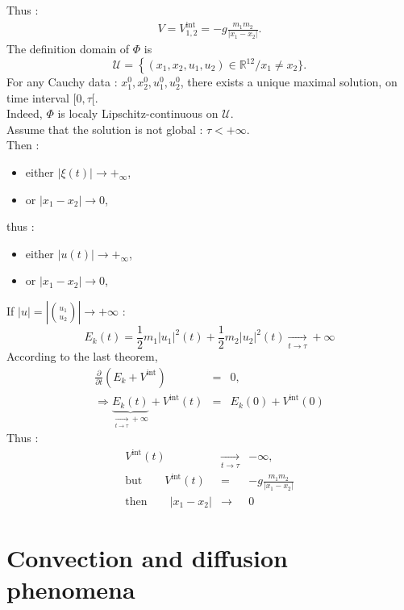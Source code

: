 \documentclass{report}
\newcommand*{\bfrac}[2]{\genfrac{(}{)}{0pt}{}{#1}{#2}}
\theoremstyle{plain}
\theoremstyle{definition}
\theoremstyle{remark}
\begin{document}
Thus : 
\begin{eqnarray}
V = V_{1,2}^{\text{int}} = - g \frac{m_1 m_2}{\vert x_1 - x_2\vert}.
\end{eqnarray} 
The definition domain of $\Phi$ is 
\begin{equation}
\mathcal{U} = \left\lbrace (x_1,x_2,u_1,u_2) \in \mathbb{R}^{12} / x_1 \neq x_2 \right.\rbrace.
\end{equation}
For any Cauchy data : $x_1^0,x_2^0,u_1^0,u_2^0$, there exists a unique maximal solution, on time interval $[0,\tau[$. \\Indeed, $\Phi$ is localy Lipschitz-continuous on $\mathcal{U}$. \\
Assume that the solution is not global : $\tau < +\infty$.\\
Then : 
\begin{itemize}
\item either $\vert \xi(t) \vert \rightarrow +_\infty$,
\item or $\vert x_1 - x_2 \vert \rightarrow 0$,
\end{itemize}
thus : 
\begin{itemize}
\item either $\vert u(t) \vert \rightarrow +_\infty$,
\item or $\vert x_1 - x_2 \vert \rightarrow 0$,
\end{itemize}
If $\vert u \vert = \left\vert \bfrac{u_1}{u_2} \right\vert \rightarrow +\infty$ : 
\begin{equation}
E_k(t) = \frac{1}{2}m_1\vert u_1\vert^2(t) + \frac{1}{2}m_2\vert u_2\vert^2(t)\xrightarrow[t\rightarrow\tau]{}+\infty 
\end{equation}
According to the last theorem, 
\begin{eqnarray}
\frac{\partial}{\partial t}\left(E_k + V^{\text{int}} \right) &=& 0, \\ 
\Rightarrow \underbrace{E_k(t)}_{\xrightarrow[t\rightarrow\tau]{}+\infty } + V^{\text{int}}(t) &=& E_k(0) + V^{\text{int}}(0)
\end{eqnarray}
Thus :
\begin{eqnarray}
V^{\text{int}}(t) &\xrightarrow[t\rightarrow\tau]{}& -\infty, \\
\text{but} \qquad V^{\text{int}}(t) &=& -g \frac{m_1 m_2}{\vert x_1 - x_2 \vert} \\
\text{then} \qquad \vert x_1 - x_2 \vert &\rightarrow & 0
\end{eqnarray}
\chapter{Convection and diffusion phenomena}
\end{document}
